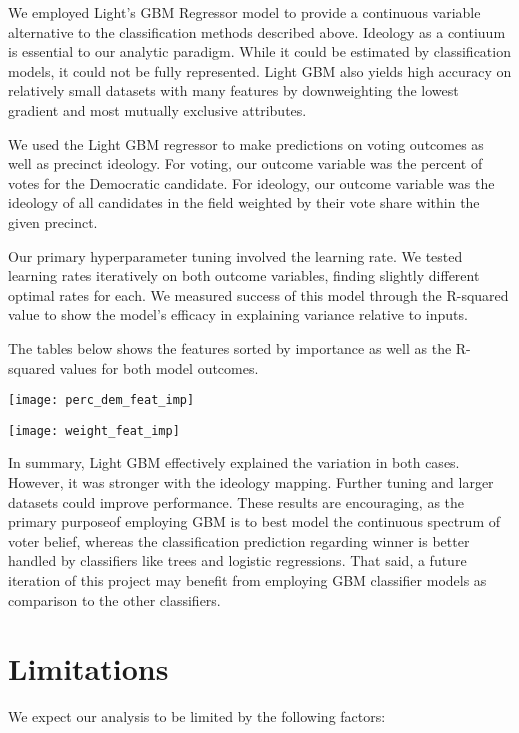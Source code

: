 \documentclass{article}
\begin{document}
\begin{itemize}
We employed Light's GBM Regressor model to provide a continuous variable alternative
to the classification methods described above. Ideology as a contiuum 
is essential to our analytic paradigm. While it could be estimated by classification
models, it could not be fully represented. Light GBM also yields high accuracy
on relatively small datasets with many features by downweighting the lowest gradient
and most mutually exclusive attributes.

We used the Light GBM regressor to make predictions on voting outcomes as well as
precinct ideology. For voting, our outcome variable was the percent of votes for the
Democratic candidate. For ideology, our outcome variable was the ideology of all
candidates in the field weighted by their vote share within the given precinct.

Our primary hyperparameter tuning involved the learning rate. We tested learning rates
iteratively on both outcome variables, finding slightly different optimal rates for each.
We measured success of this model through the R-squared value to show the model's
efficacy in explaining variance relative to inputs.

The tables below shows the features sorted by importance as well as the R-squared values
for both model outcomes.

\texttt{[image: perc\_dem\_feat\_imp]}

\texttt{[image: weight\_feat\_imp]}

In summary, Light GBM effectively explained the variation in both cases. However, it was
stronger with the ideology mapping. Further tuning and larger datasets could improve performance. 
These results are encouraging, as the primary purposeof employing GBM is to best model the
continuous spectrum of voter belief, whereas the classification prediction regarding winner
is better handled by classifiers like trees and logistic regressions. That said, a future
iteration of this project may benefit from employing GBM classifier models as comparison to
the other classifiers.

\section{Limitations}

We expect our analysis to be limited by the following factors:


\end{itemize}
\end{document}
